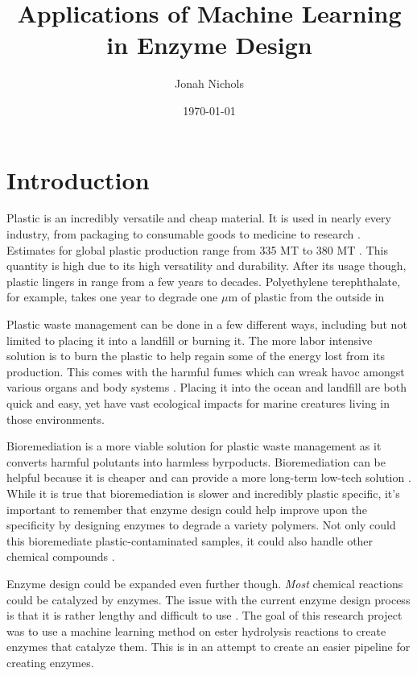 \documentclass[12pt]{article}
\title{Applications of Machine Learning in Enzyme Design}
\author{Jonah Nichols}
\date{\today}
\begin{document}
\maketitle
\section{Introduction}
Plastic is an incredibly versatile and cheap material. It is used in nearly every industry,
from packaging to consumable goods to medicine to research \cite{geyer2017production}.
Estimates for global plastic production range from 335 MT to 380 MT \cite{drzyzga2019plastic,
geyer2017production,leal2019overview}. This quantity is high due to its high versatility
and durability. After its usage though, plastic lingers in range from a few years
to decades. Polyethylene terephthalate, for example, takes one year to degrade one
$\mu$m of plastic from the outside in \cite{chamas2020degradation}

Plastic waste management can be done in a few different ways, including but not
limited to placing it into a landfill or burning it.
The more labor intensive solution is to burn the plastic to help regain some of
the energy lost from its production. This comes with the harmful fumes which can
wreak havoc amongst various organs and body systems \cite{agnes2016environmental}.
Placing it into the ocean and landfill are both quick and easy, yet have vast ecological
impacts for marine creatures living in those environments.


Bioremediation is a more viable solution for plastic waste management as it converts
harmful polutants into harmless byrpoducts. Bioremediation
can be helpful because it is cheaper and can provide a more long-term low-tech solution \cite{vidali2001bioremediation}.
While it is true that bioremediation is slower and incredibly plastic specific,
it's important to remember that enzyme design could help improve upon the specificity
by designing enzymes to degrade a variety polymers. Not only could this bioremediate
plastic-contaminated samples, it could also handle other chemical compounds \cite{karigar2011role}.

Enzyme design could be expanded even further though. \textit{Most} chemical reactions could
be catalyzed by enzymes. The issue with the current enzyme design process is that it is rather
lengthy and difficult to use \cite{richter2011novo}. The goal of this research project was to
use a machine learning method on ester hydrolysis reactions to create enzymes that catalyze them.
This is in an attempt to create an easier pipeline for creating enzymes.
\end{document}
